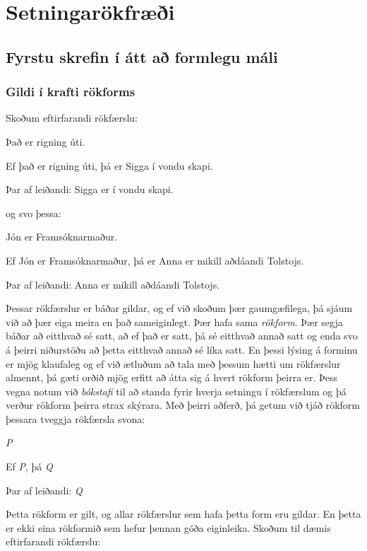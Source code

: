 \part{Setningarökfræði}
\label{ch.TFL}

\chapter{Fyrstu skrefin í átt að formlegu máli}

\section{Gildi í krafti rökforms}\label{s:ValidityInVirtueOfForm}
Skoðum eftirfarandi rökfærslu:
	\begin{earg}
		\item[] Það er rigning úti.
		\item[] Ef það er rigning úti, þá er Sigga í vondu skapi.
		\item[Þar af leiðandi:] Sigga er í vondu skapi.
	\end{earg}
og svo þessa:
	\begin{earg}
		\item[] Jón er Framsóknarmaður.
		\item[] Ef Jón er Framsóknarmaður, þá er Anna er mikill aðdáandi Tolstojs.
		\item[Þar af leiðandi:] Anna er mikill aðdáandi Tolstojs.
	\end{earg}
Þessar rökfærslur er báðar gildar, og ef við skoðum þær gaumgæfilega, þá sjáum við að þær eiga meira en það sameiginlegt. Þær hafa sama \emph{rökform}. Þær segja báðar að eitthvað sé satt, að ef það er satt, þá sé eitthvað annað satt og enda svo á þeirri niðurstöðu að þetta eitthvað annað sé líka satt. En þessi lýsing á forminu er mjög klaufaleg og ef við ætluðum að tala með þessum hætti um rökfærslur almennt, þá gæti orðið mjög erfitt að átta sig á hvert rökform þeirra er. Þess vegna notum við \emph{bókstafi} til að standa fyrir hverja setningu í rökfærslum og þá verður rökform þeirra strax skýrara. Með þeirri aðferð, þá getum við tjáð rökform þessara tveggja rökfærsla svona: 
	\begin{earg}
		\item[] \emph{P}
		\item[] Ef \emph{P}, þá \emph{Q}
		\item[Þar af leiðandi:] \emph{Q}
	\end{earg}
Þetta rökform er gilt, og allar rökfærslur sem hafa þetta form eru gildar. En þetta er ekki eina rökformið sem hefur þennan góða eiginleika.  Skoðum til dæmis eftirfarandi rökfærslu:
